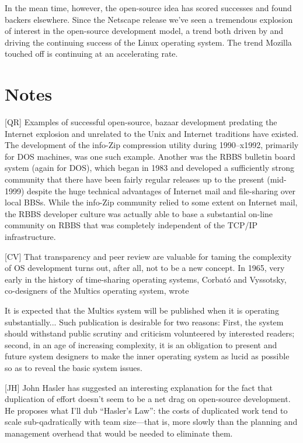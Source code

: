 \documentclass[a4paper,12pt,UTF8,twoside]{ctexbook}
\begin{document}
In the mean time, however, the open-source idea has scored successes and found backers elsewhere. Since the Netscape release we've seen a tremendous explosion of interest in the open-source development model, a trend both driven by and driving the continuing success of the Linux operating system. The trend Mozilla touched off is continuing at an accelerating rate.

\chapter{Notes}

[QR] Examples of successful open-source, bazaar development predating the Internet explosion and unrelated to the Unix and Internet traditions have existed. The development of the info-Zip compression utility during 1990–x1992, primarily for DOS machines, was one such example. Another was the RBBS bulletin board system (again for DOS), which began in 1983 and developed a sufficiently strong community that there have been fairly regular releases up to the present (mid-1999) despite the huge technical advantages of Internet mail and file-sharing over local BBSs. While the info-Zip community relied to some extent on Internet mail, the RBBS developer culture was actually able to base a substantial on-line community on RBBS that was completely independent of the TCP/IP infrastructure.

[CV] That transparency and peer review are valuable for taming the complexity of OS development turns out, after all, not to be a new concept. In 1965, very early in the history of time-sharing operating systems, Corbató and Vyssotsky, co-designers of the Multics operating system, wrote

It is expected that the Multics system will be published when it is operating substantially... Such publication is desirable for two reasons: First, the system should withstand public scrutiny and criticism volunteered by interested readers; second, in an age of increasing complexity, it is an obligation to present and future system designers to make the inner operating system as lucid as possible so as to reveal the basic system issues.

[JH] John Hasler has suggested an interesting explanation for the fact that duplication of effort doesn't seem to be a net drag on open-source development. He proposes what I'll dub ``Hasler's Law'': the costs of duplicated work tend to scale sub-qadratically with team size—that is, more slowly than the planning and management overhead that would be needed to eliminate them.
\end{document}
